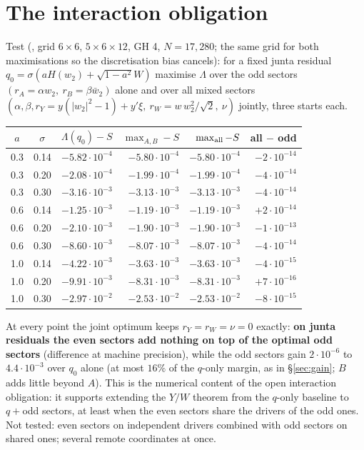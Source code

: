 \documentclass[11pt,a4paper]{article}
\begin{document}
\section{The interaction obligation}\label{sec:interaction}
Test (, grid $6{\times}6$, $5{\times}6{\times}12$, GH 4, $N=17{,}280$; the same grid for both maximisations so the discretisation bias cancels): for a fixed junta
residual $q_0=\sigma(aH(w_2)+\sqrt{1-a^2}W)$ maximise $\Lambda$ over the odd sectors $(r_A=\alpha w_2,\ r_B=\beta\bar w_2)$ alone and over all mixed sectors
$(\alpha,\beta,r_Y=y(|w_2|^2-1)+y'\xi,\ r_W=w\,w_2^2/\sqrt2,\ \nu)$ jointly, three starts each.
\begin{center}\small\begin{tabular}{ccrrrr}\toprule
$a$ & $\sigma$ & $\Lambda(q_0)-S$ & $\max_{A,B}-S$ & $\max_{\rm all}-S$ & all $-$ odd\\\midrule
0.3 & 0.14 & $-5.82\cdot10^{-4}$ & $-5.80\cdot10^{-4}$ & $-5.80\cdot10^{-4}$ & $-2\cdot10^{-14}$\\
0.3 & 0.20 & $-2.08\cdot10^{-4}$ & $-1.99\cdot10^{-4}$ & $-1.99\cdot10^{-4}$ & $-4\cdot10^{-14}$\\
0.3 & 0.30 & $-3.16\cdot10^{-3}$ & $-3.13\cdot10^{-3}$ & $-3.13\cdot10^{-3}$ & $-4\cdot10^{-14}$\\
0.6 & 0.14 & $-1.25\cdot10^{-3}$ & $-1.19\cdot10^{-3}$ & $-1.19\cdot10^{-3}$ & $+2\cdot10^{-14}$\\
0.6 & 0.20 & $-2.10\cdot10^{-3}$ & $-1.90\cdot10^{-3}$ & $-1.90\cdot10^{-3}$ & $-1\cdot10^{-13}$\\
0.6 & 0.30 & $-8.60\cdot10^{-3}$ & $-8.07\cdot10^{-3}$ & $-8.07\cdot10^{-3}$ & $-4\cdot10^{-14}$\\
1.0 & 0.14 & $-4.22\cdot10^{-3}$ & $-3.63\cdot10^{-3}$ & $-3.63\cdot10^{-3}$ & $-4\cdot10^{-15}$\\
1.0 & 0.20 & $-9.91\cdot10^{-3}$ & $-8.31\cdot10^{-3}$ & $-8.31\cdot10^{-3}$ & $+7\cdot10^{-16}$\\
1.0 & 0.30 & $-2.97\cdot10^{-2}$ & $-2.53\cdot10^{-2}$ & $-2.53\cdot10^{-2}$ & $-8\cdot10^{-15}$\\\bottomrule\end{tabular}\end{center}
At every point the joint optimum keeps $r_Y=r_W=\nu=0$ exactly: \textbf{on junta residuals the even sectors add nothing on top of the optimal odd sectors} (difference at machine
precision), while the odd sectors gain $2\cdot10^{-6}$ to $4.4\cdot10^{-3}$ over $q_0$ alone (at most $16\%$ of the $q$-only margin, as in \S\ref{sec:gain}; $B$ adds little beyond $A$).
This is the numerical content of the open interaction obligation: it supports extending the $Y/W$ theorem from the $q$-only baseline to $q+$odd sectors, at least when the even
sectors share the drivers of the odd ones. Not tested: even sectors on independent drivers combined with odd sectors on shared ones; several remote coordinates at once.
\end{document}
